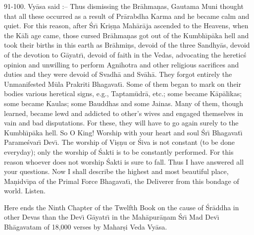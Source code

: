 91-100. Vy\=asa said :-- Thus dismissing the Br\=ahma\d{n}as, Gautama Muni thought that all these occurred as a result of Pr\=arabdha Karma and he became calm and quiet. For this reason, after \'Sr\={\i} Kri\d{s}\d{n}a Mah\=ar\=aja ascended to the Heavens, when the K\=al\={\i} age came, those cursed Br\=ahma\d{n}as got out of the Kumbh\={\i}p\=aka hell and took their births in this earth as Br\=ahmi\d{n}s, devoid of the three Sandhy\=as, devoid of the devotion to G\=ayatr\={\i}, devoid of faith in the Vedas, advocating the heretic\'s opinion and unwilling to perform Agnihotra and other religious sacrifices and duties and they were devoid of Svadh\=a and Sv\=ah\=a. They forgot entirely the Unmanifested M\=ula Prakriti Bhagavat\={\i}. Some of them began to mark on their bodies various heretical signs, e.g., Taptam\=udr\=a, etc.; some became K\=ap\=alikas; some became Kaulas; some Bauddhas and some Jainas. Many of them, though learned, became lewd and addicted to other's wives and engaged themselves in vain and bad disputations. For these, they will have to go again surely to the Kumbh\={\i}p\=aka hell. So O King! Worship with your heart and soul \'Sr\={\i} Bhagavat\={\i} Parame\'svar\={\i} Dev\={\i}. The worship of Vi\d{s}\d{n}u or \'Siva is not constant (to be done everyday); only the worship of \'Sakti is to be constantly performed. For this reason whoever does not worship \'Sakti is sure to fall. Thus I have answered all your questions. Now I shall describe the highest and most beautiful place, Ma\d{n}idv\={\i}pa of the Primal Force Bhagavat\={\i}, the Deliverer from this bondage of world. Listen.

Here ends the Ninth Chapter of the Twelfth Book on the cause of \'Sr\=addha in other Devas than the Dev\={\i} G\=ayatr\={\i} in the Mah\=apur\=a\d{n}am \'Sr\={\i} Mad Dev\={\i} Bh\=agavatam of 18,000 verses by Mahar\d{s}i Veda Vy\=asa.



